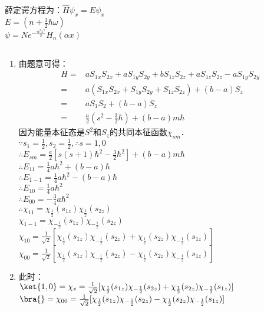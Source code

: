 薛定谔方程为：$\hat{H}\psi_{x} = E\psi_{x}$ \\

$E=(n+\frac{1}{2} \hbar \omega)$ \\

$\psi = Ne^{-\frac{\alpha^{2}x^{2}}{2}}H_{n}(\alpha x)$
\subsection{ }
\begin{enumerate}
\item 由题意可得：\\
\begin{equation}
\begin{aligned}
H =& aS_{1x}S_{2x}+aS_{1y}S_{2y}+bS_{1z}S_{2z}+aS_{1z}S_{2z}-aS_{1y}S_{2y} \\
=& a(S_{1x}S_{2x}+S_{1y}S_{2y}+S_{1z}S_{2z})+(b-a)S_{z} \\
=& aS_{1}S_{2}+(b-a)S_z \\
=& \frac{a}{2}(s^{2}-\frac{3}{2}\hbar)+(b-a)m\hbar
\end{aligned}
\end{equation}
因为能量本征态是$S^{2}$和$S_{z}$的共同本征函数$\chi_{sm}$．\\
$\because s_{1}=\frac{1}{2},s_{2}=\frac{1}{2},\therefore s=1,0 $ \\
$\therefore E_{sm}=\frac{a}{2}[s(s+1)\hbar^{2}-\frac{3}{2}\hbar^{2}]+(b-a)m\hbar $ \\
$\therefore E_{11}=\frac{1}{4}a\hbar^{2}+(b-a)\hbar $ \\
$\therefore E_{1-1}=\frac{1}{4}a\hbar^{2}-(b-a)\hbar $ \\
$\therefore E_{10}=\frac{1}{4}a\hbar^{2} $ \\
$\therefore E_{00}=-\frac{3}{4}a\hbar^{2} $ \\
$\therefore \chi_{11}=\chi_{\frac{1}{2}}(s_{1z})\chi_{\frac{1}{2}}(s_{2z}) $ \\
$\chi_{1-1}=\chi_{-\frac{1}{2}}(s_{1z})\chi_{-\frac{1}{2}}(s_{2z}) $ \\
$\chi_{10}=\frac{1}{\sqrt{2}}[\chi_{\frac{1}{2}}(s_{1z})\chi_{-\frac{1}{2}}(s_{2z})+\chi_{\frac{1}{2}}(s_{2z})\chi_{-\frac{1}{2}}(s_{1z})] $ \\
$\chi_{00}=\frac{1}{\sqrt{2}}[\chi_{\frac{1}{2}}(s_{1z})\chi_{-\frac{1}{2}}(s_{2z})-\chi_{\frac{1}{2}}(s_{2z})\chi_{-\frac{1}{2}}(s_{1z})] $ 
\item 此时：\\
$\ket{1,0}=\chi_{s}=\frac{1}{\sqrt{2}}[\chi_{\frac{1}{2}}(s_{1z})\chi_{-\frac{1}{2}}(s_{2z})+\chi_{\frac{1}{2}}(s_{2z})\chi_{-\frac{1}{2}}(s_{1z})] $ \\
$\bra{}=\chi_{00}=\frac{1}{\sqrt{2}}[\chi_{\frac{1}{2}}(s_{1z})\chi_{-\frac{1}{2}}(s_{2z})-\chi_{\frac{1}{2}}(s_{2z})\chi_{-\frac{1}{2}}(s_{1z})] $
\end{enumerate}